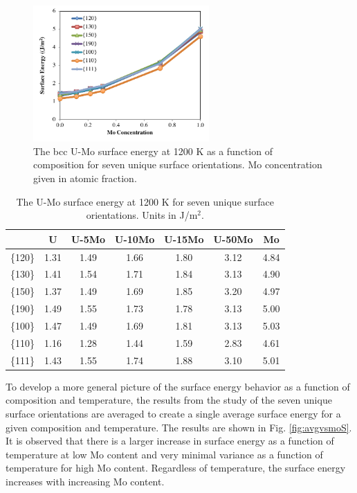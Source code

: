 \documentclass[review]{elsarticle}
\begin{document}
\begin{figure}[h]
 \centering
 \includegraphics[width=0.6\textwidth]{umosurf1200.png} 
 \caption{The bcc U-Mo surface energy at 1200 K as a function of composition for seven unique surface orientations. Mo concentration given in atomic fraction.}
 \label{fig:umosurf1200}
\end{figure}

\begin{table}[h]
\caption{The U-Mo surface energy at 1200 K for seven unique surface orientations. Units in J/m$^{2}$.} \label{tab:umosurf1200}
\begin{center}
\begin{tabular}{|c|c|c|c|c|c|c|}
	\hline
 & U & U-5Mo & U-10Mo & U-15Mo & U-50Mo & Mo \\
\hline
\{120\} & 1.31 & 1.49 & 1.66 & 1.80 & 3.12 & 4.84 \\
\{130\}	 & 1.41 & 1.54 & 1.71 & 1.84 & 3.13 & 4.90 \\ 
\{150\}	 & 1.37 & 1.49 & 1.69 & 1.85 & 3.20 & 4.97 \\
\{190\}	 & 1.49 & 1.55 & 1.73 & 1.78 & 3.13 & 5.00 \\
\{100\}	 & 1.47 & 1.49 & 1.69 & 1.81 & 3.13 & 5.03 \\
\{110\}	 & 1.16 & 1.28 & 1.44 & 1.59 & 2.83 & 4.61 \\
\{111\}	 & 1.43 & 1.55 & 1.74 & 1.88 & 3.10 & 5.01 \\
 	 \hline
\end{tabular}
\end{center}
\label{default}
\end{table}

\FloatBarrier

To develop a more general picture of the surface energy behavior as a function of composition and temperature, the results from the study of the seven unique surface orientations are averaged to create a single average surface energy for a given composition and temperature. The results are shown in Fig. \ref{fig:avgvsmoS}. It is observed that there is a larger increase in surface energy as a function of temperature at low Mo content and very minimal variance as a function of temperature for high Mo content. Regardless of temperature, the surface energy increases with increasing Mo content. 
\end{document}

